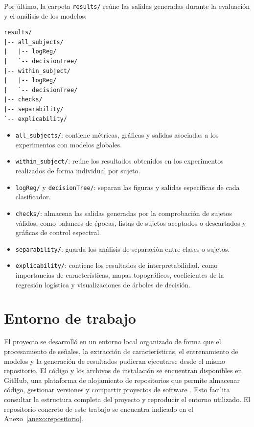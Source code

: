 Por último, la carpeta \texttt{results/} reúne las salidas generadas durante la evaluación y el análisis de los modelos:

\begin{lstlisting}
results/
|-- all_subjects/
|   |-- logReg/
|   `-- decisionTree/
|-- within_subject/
|   |-- logReg/
|   `-- decisionTree/
|-- checks/
|-- separability/
`-- explicability/
\end{lstlisting}

\begin{itemize}
    \item \texttt{all\_subjects/}: contiene métricas, gráficas y salidas asociadas a los experimentos con modelos globales.
    \item \texttt{within\_subject/}: reúne los resultados obtenidos en los experimentos realizados de forma individual por sujeto.
    \item \texttt{logReg/} y \texttt{decisionTree/}: separan las figuras y salidas específicas de cada clasificador.
    \item \texttt{checks/}: almacena las salidas generadas por la comprobación de sujetos válidos, como balances de épocas, listas de sujetos aceptados o descartados y gráficas de control espectral.
    \item \texttt{separability/}: guarda los análisis de separación entre clases o sujetos.
    \item \texttt{explicability/}: contiene los resultados de interpretabilidad, como importancias de características, mapas topográficos, coeficientes de la regresión logística y visualizaciones de árboles de decisión.
\end{itemize}

\section{Entorno de trabajo}

El proyecto se desarrolló en un entorno local organizado de forma que el procesamiento de señales, la extracción de características, el entrenamiento de modelos y la generación de resultados pudieran ejecutarse desde el mismo repositorio. El código y los archivos de instalación se encuentran disponibles en GitHub, una plataforma de alojamiento de repositorios que permite almacenar código, gestionar versiones y compartir proyectos de software \cite{githubDocs}. Esto facilita consultar la estructura completa del proyecto y reproducir el entorno utilizado. El repositorio concreto de este trabajo se encuentra indicado en el Anexo~\ref{anexo:repositorio}.

